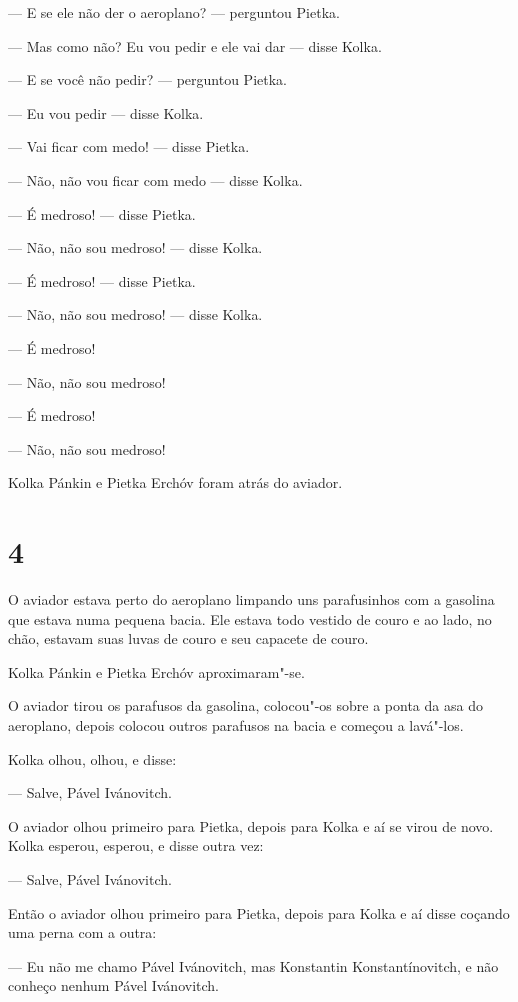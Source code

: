 --- E se ele não der o aeroplano? --- perguntou Pietka.

--- Mas como não? Eu vou pedir e ele vai dar --- disse Kolka.

--- E se você não pedir? --- perguntou Pietka.

--- Eu vou pedir --- disse Kolka.

--- Vai ficar com medo! --- disse Pietka.

--- Não, não vou ficar com medo --- disse Kolka.

--- É medroso! --- disse Pietka.

--- Não, não sou medroso! --- disse Kolka.

--- É medroso! --- disse Pietka.

--- Não, não sou medroso! --- disse Kolka.

--- É medroso!

--- Não, não sou medroso!

--- É medroso!

--- Não, não sou medroso!

Kolka Pánkin e Pietka Erchóv foram atrás do aviador.

\section{4}

O aviador estava perto do aeroplano limpando uns parafusinhos com a
gasolina que estava numa pequena bacia. Ele estava todo vestido de couro
e ao lado, no chão, estavam suas luvas de couro e seu capacete de couro.

Kolka Pánkin e Pietka Erchóv aproximaram"-se.

O aviador tirou os parafusos da gasolina, colocou"-os sobre a ponta da
asa do aeroplano, depois colocou outros parafusos na bacia e começou a
lavá"-los.

Kolka olhou, olhou, e disse:

--- Salve, Pável Ivánovitch.

O aviador olhou primeiro para Pietka, depois para Kolka e aí se virou de
novo. Kolka esperou, esperou, e disse outra vez:

--- Salve, Pável Ivánovitch.

Então o aviador olhou primeiro para Pietka, depois para Kolka e aí disse
coçando uma perna com a outra:

--- Eu não me chamo Pável Ivánovitch, mas Konstantin Konstantínovitch, e
não conheço nenhum Pável Ivánovitch.

